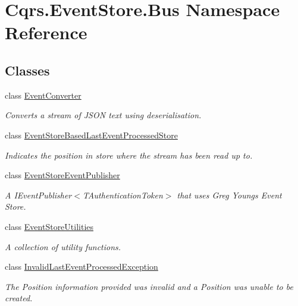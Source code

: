\hypertarget{namespaceCqrs_1_1EventStore_1_1Bus}{}\section{Cqrs.\+Event\+Store.\+Bus Namespace Reference}
\label{namespaceCqrs_1_1EventStore_1_1Bus}
\subsection*{Classes}
\begin{DoxyCompactItemize}
\item 
class \hyperlink{classCqrs_1_1EventStore_1_1Bus_1_1EventConverter}{Event\+Converter}
\begin{DoxyCompactList}\small\item\em Converts a stream of J\+S\+ON text using deserialisation. \end{DoxyCompactList}\item 
class \hyperlink{classCqrs_1_1EventStore_1_1Bus_1_1EventStoreBasedLastEventProcessedStore}{Event\+Store\+Based\+Last\+Event\+Processed\+Store}
\begin{DoxyCompactList}\small\item\em Indicates the position in store where the stream has been read up to. \end{DoxyCompactList}\item 
class \hyperlink{classCqrs_1_1EventStore_1_1Bus_1_1EventStoreEventPublisher}{Event\+Store\+Event\+Publisher}
\begin{DoxyCompactList}\small\item\em A I\+Event\+Publisher$<$\+T\+Authentication\+Token$>$ that uses Greg Young\textquotesingle{}s Event Store. \end{DoxyCompactList}\item 
class \hyperlink{classCqrs_1_1EventStore_1_1Bus_1_1EventStoreUtilities}{Event\+Store\+Utilities}
\begin{DoxyCompactList}\small\item\em A collection of utility functions. \end{DoxyCompactList}\item 
class \hyperlink{classCqrs_1_1EventStore_1_1Bus_1_1InvalidLastEventProcessedException}{Invalid\+Last\+Event\+Processed\+Exception}
\begin{DoxyCompactList}\small\item\em The Position information provided was invalid and a Position was unable to be created. \end{DoxyCompactList}\end{DoxyCompactItemize}
